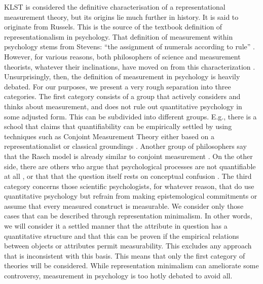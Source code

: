 \documentclass[utf8]{FrontiersinVancouver}
\begin{document}
KLST is considered the definitive characterisation of a representational measurement theory, but its origins lie much further in history. It is said to originate from Russels. This is the source of the textbook definition of representationalism in psychology. That definition of measurement within psychology stems from Stevens: ``the assignment of numerals according to rule'' \citep{stevensMathematicsMeasurementPsychophysics1951}. However, for various reasons, both philosophers of science and measurement theorists, whatever their inclinations, have moved on from this characterization \citep{michellMeasurementPsychologyCritical1999}. Unsurprisingly, then, the definition of measurement in psychology is heavily debated. For our purposes, we present a very rough separation into three categories. The first category consists of a group that actively considers and thinks about measurement, and does not rule out quantitative psychology in some adjusted form. This can be subdivided into different groups. E.g., there is a school that claims that quantifiability can be empirically settled by using techniques such as Conjoint Measurement Theory either based on a representationalist or classical groundings \citep{luceSimultaneousConjointMeasurement1964,krantzFoundationsMeasurement1971, michellMeasurementPsychologyCritical1999}. Another group of philosophers say that the Rasch model is already similar to conjoint measurement \citep{borsboomWhyPsychometricsNot2004}. On the other side, there are others who argue that psychological processes are not quantifiable at all \citep{trendlerConjointMeasurementUndone2019}, or that that the question itself rests on conceptual confusion \citep{franzArePsychologicalAttributes2022,tafreshiSenseNonsensePsychological2022}. The third category concerns those scientific psychologists, for whatever reason, that do use quantitative psychology but refrain from making epistemological commitments or assume that every measured construct is measurable. We consider only those cases that can be described through representation minimalism. In other words, we will consider it a settled manner that the attribute in question has a quantitative structure and that this can be proven if the empirical relations between objects or attributes permit measurability. This excludes any approach that is inconsistent with this basis. This means that only the first category of theories will be considered. While representation minimalism can ameliorate some controversy, measurement in psychology is too hotly debated to avoid all.
\end{document}
